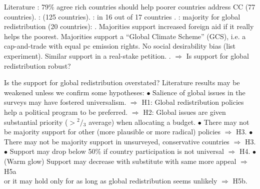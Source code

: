 \documentclass[aspectratio=169,xcolor=dvipsnames, 11pt,mathserif]{beamer}
\begin{document}
\begin{frame}{Literature\label{literature}}
\bbvsp
\ip {}: 79\% agree rich countries should help poorer countries address CC (77 countries).
\ip {}:  (125 countries).
\ip {}:  in 16 out of 17 countries .
\ip {}:  majority  for global redistribution (20 countries):
\bbvsp \ip {}.
\ip Majorities support increased foreign aid if it really helps the poorest.
\ip Majorities support a ``Global Climate Scheme'' (GCS), i.e. a cap-and-trade with equal pc emission rights.
\ip No social desirability bias (list experiment). Similar support in a real-stake petition.
\ip {}.
\ee 
\ip $\Rightarrow$ Is support for global redistribution robust?
\ee
\end{frame}

\begin{frame}{Is the support for global redistribution overstated?}
\bbsp
\ip Literature results may be weakened unless we confirm some hypotheses:
\ip $\bullet$ Salience of global issues in the surveys may have fostered universalism. %
\ip $\Rightarrow$ H1: Global redistribution policies help a political program to be preferred.
\ip $\Rightarrow$ H2: Global issues are given substantial priority ($>\!^{2}\!/\!_{3}$ average) when allocating a budget.
\ip $\bullet$ There may not be majority support for other (more plausible or more radical) policies $\Rightarrow$ H3.
\ip $\bullet$ There may not be majority support in unsurveyed, conservative countries $\Rightarrow$ H3.
\ip $\bullet$ Support may drop below 50\% if country participation is not universal $\Rightarrow$ H4.
\ip $\bullet$ (Warm glow) Support may decrease with substitute with same more appeal $\Rightarrow$ H5a \\ 
\quad or it may hold only for as long as global redistribution seems unlikely $\Rightarrow$ H5b.
\ee
\end{frame}
\end{document}
